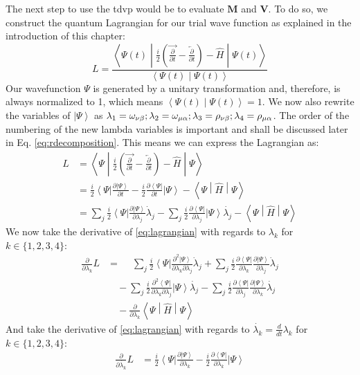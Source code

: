 \documentclass{aux/ttuthes2007}
\newcommand{\bra}[1]{\ensuremath{\left\langle#1\right\vert}}
\newcommand{\ket}[1]{\ensuremath{\left|#1\right\rangle}}
\newcommand{\braket}[2]{\left< #1 \middle\vert #2 \right>}
\newcommand{\sandwich}[3]{\left< #1 \middle\vert #2 \middle\vert #3 \right>}
\newcommand{\dd}[1]{\frac{d}{d#1}}
\newcommand{\pd}[1]{\frac{\partial}{\partial #1}}
\newcommand{\kpp}[1]{\frac{\partial \ket\Psi}{\partial #1}}
\newcommand{\bpp}[1]{\frac{\partial \bra\Psi}{\partial #1}}
\newcommand{\kppd}[2]{\frac{\partial^{2} \ket\Psi}{\partial #1 \partial #2}}
\newcommand{\bppd}[2]{\frac{\partial^{2} \bra\Psi}{\partial #1 \partial #2}}
\newcommand{\ind}[1]{{\uo #1 \oo #1}}
\newcommand{\uo}[1]{
		\IfEqCase{#1}{
			{0}{\mu}
			{1}{\nu}
			{2}{\xi}
		}[\PackageError{uo}{Undefined option to uo: #1}{}]
}
\newcommand{\oo}[1]{
		\IfEqCase{#1}{
			{0}{\alpha}
			{1}{\beta}
			{2}{\gamma}
		}[\PackageError{unocorb}{Undefined option to unuo: #1}{}]
}
\begin{document}
The next step to use the \gls{tdvp} would be to evaluate $\bm M$ and $\bm V$.
To do so, we construct the quantum Lagrangian for our trial wave function as explained in the introduction of this chapter:
\[
	L = \frac{\sandwich{\Psi(t)}{\frac{i}{2}\left(\overrightarrow{\pd t} - \overleftarrow{\pd t}\right) - \hat H}{\Psi(t)}}{\braket{\Psi(t)}{\Psi(t)}}
\]
%
Our wavefunction $\Psi$ is generated by a unitary transformation and, therefore, is always normalized to 1, which means $\braket{\Psi(t)}{\Psi(t)} = 1$. We now also rewrite the variables of $\ket{\Psi}$ as 
$\lambda_1 = \omega_\ind 1; \lambda_2 = \omega_\ind 0; \lambda_3 = \rho_\ind 1; \lambda_4 = \rho_\ind 0$.
The order of the numbering of the new lambda variables is important and shall be discussed later in Eq. \ref{eq:rdecomposition}. 
This means we can express the Lagrangian as:
\begin{equation}
	\begin{split}
		\label{eq:lagrangian}
		L &= \sandwich{\Psi}{\frac{i}{2}\left(\overrightarrow{\pd t} - \overleftarrow{\pd t}\right) - \hat H}{\Psi} \\
		  &= \frac{i}{2}\bra{\Psi}{\kpp t} - \frac{i}{2}{\bpp{t}}\ket{\Psi} - \sandwich{\Psi}{\hat H}{\Psi} \\
		  &= 	
			\sum_j \frac{i}{2}\bra{\Psi}{\kpp {\lambda_j}} \dot \lambda_j
		- 	\sum_j \frac{i}{2}{\bpp{\lambda_j}}\ket{\Psi}\dot{\lambda_j}
		- \sandwich{\Psi}{\hat H}{\Psi}
	\end{split}
\end{equation}
%
We now take the derivative of \ref{eq:lagrangian} with regards to $\lambda_k$ for $k \in \{1, 2, 3, 4\}$:
%
\begin{equation*}
	\begin{split}
	\pd{\lambda_k} L &= 	
	\phantom{-}\sum_j \frac{i}{2}\bra{\Psi}{\kppd {\lambda_k}{\lambda_j}} \dot \lambda_j
	+	\sum_j \frac{i}{2}\bpp{\lambda_k}{\kpp {\lambda_j}} \dot \lambda_j \\
	&\quad -\sum_j \frac{i}{2}{\bppd{\lambda_k}{\lambda_j}}\ket{\Psi}\dot{\lambda_j}
	- 	\sum_j \frac{i}{2}{\bpp{\lambda_j}}\kpp{\lambda_k}\dot{\lambda_j}\\
	&\quad -\pd{\lambda_k} \sandwich{\Psi}{\hat H}{\Psi}
	\end{split}
\end{equation*}
%
And take the derivative of \ref{eq:lagrangian} with regards to $\dot{\lambda_k} = \dd{t} \lambda_k$ for $k \in \{1, 2, 3, 4\}$:
%
\begin{equation*}
	\begin{split}
		\label{eq:euler-lagrange}
		\pd{\dot{\lambda_k}} L &=
		\frac{i}{2}\bra{\Psi}{\kpp {\lambda_k}}
	- 	\frac{i}{2}{\bpp{\lambda_k}}\ket{\Psi}
	\end{split}
\end{equation*}
\end{document}
